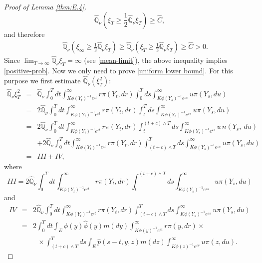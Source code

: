 \documentclass[12pt,a4paper]{amsart}
\numberwithin{equation}{section}
\theoremstyle{plain}
\theoremstyle{definition}
\theoremstyle{remark}
\begin{document}
\begin{proof}[Proof of Lemma \ref{thm:E.4}]
$$
\widehat{\mathbb Q}_{\nu}\left(\xi_T\geq \frac{1}{2}\widehat{\mathbb Q}_{\nu}
\xi_T\right)\geq \widehat C,
$$
and therefore
\begin{eqnarray*}
&&\widehat{\mathbb Q}_{\nu}\left(\xi_\infty\geq
\frac{1}{2}\widehat{\mathbb Q}_{\nu} \xi_T\right)
\geq\widehat{\mathbb Q}_{\nu}\left(\xi_T\geq \frac{1}{2} \widehat{\mathbb Q}_{\nu}
\xi_T\right)\ge\widehat C>0.
\end{eqnarray*}
Since $\lim_{T\rightarrow\infty}\widehat{\mathbb Q}_{\nu} \xi_T=\infty$
(see \eqref{mean-limit}), the above inequality implies
\eqref{positive-prob}.  Now we only need to prove
 \eqref{uniform lower bound}. For this purpose we first estimate
$\widehat{\mathbb Q}_{\nu}(\xi_T^2)$:
\begin{eqnarray*}
\widehat{\mathbb Q}_{\nu}
\xi_T^2
&=&\widehat{\mathbb Q}_{\nu}\int_0^Tdt\int_{K\phi(Y_t)^{-1}e^{\varepsilon t}}^\infty r \pi(Y_t, dr)\int_0^Tds\int_{K\phi(Y_s)^{-1}e^{\varepsilon s}}^\infty u \pi(Y_s, du)\\
&=&2\widehat{\mathbb Q}_{\nu}\int_0^Tdt\int_{K\phi(Y_t)^{-1} e^{\varepsilon t}}^\infty r \pi(Y_t, dr)\int_t^Tds
\int_{K\phi(Y_s)^{-1}e^{\varepsilon s}}^\infty u \pi({Y}_s, du)\\
&=&2\widehat{\mathbb Q}_{\nu}\int_0^Tdt\int_{K\phi(Y_t)^{-1}e^{\varepsilon t}}^\infty r \pi(Y_t,dr)
\int_t^{(t+c)\wedge T}ds\int_{K\phi(Y_s)^{-1}e^{\varepsilon s}}^\infty u\, n({Y}_s,\ du)\\
&&+2\widehat{\mathbb Q}_{\nu}\int_0^{ T}dt\int_{K \phi(Y_t)^{-1}e^{\varepsilon t}}^\infty r \pi(Y_t, dr)
\int_{(t+c)\wedge T}^Tds\int_{K\phi(Y_s)^{-1}e^{\varepsilon s}}^\infty u \pi(Y_s, du)\\
&=&III+IV,
\end{eqnarray*}
where
$$
III=\displaystyle 2\widehat{\mathbb Q}_{\nu}\int_0^Tdt\int_{K\phi(Y_t)^{-1} e^{\varepsilon t}}^\infty r \pi(Y_t, dr)\int_t^{(t+c)\wedge T}ds\int_{K\phi(
Y_s)^{-1}e^{\varepsilon s}}^\infty u \pi(Y_s,du)
$$
and
\begin{eqnarray*}
IV& =& 2\widehat{\mathbb Q}_{\nu}\int_0^{T}dt \int_{K\phi(Y_t)^{-1}e^{\varepsilon t}}^\infty r \pi(Y_t, dr)
\int_{(t+c)\wedge T}^Tds\int_{K\phi(Y_s)^{-1}e^{\varepsilon s}}^\infty u \pi(Y_s, du)\\
&=& 2\int_0^{T}dt\int_E\phi(y)\widehat \phi(y)m(dy)\int_{K\phi(y)^{-1}e^{\varepsilon t}}^\infty r \pi(y, dr)\times\\
&& \ \ \ \times \int_{(t+c)\wedge T}^Tds\int_E\hat p(s-t,y,z)m(dz)\int_{K\phi(z)^{-1}e^{\varepsilon s}}^\infty u \pi(z,du).
\end{eqnarray*}

\end{proof}
\end{document}
